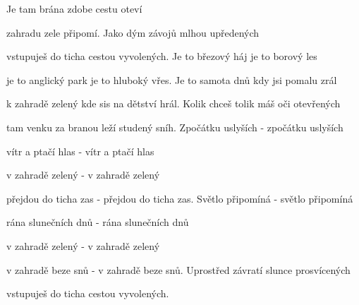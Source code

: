

\zs
Je tam brána zdobe cestu oteví

zahradu zele  připomí.
\ks
\zs
Jako dým závojů mlhou upředených

vstupuješ do ticha cestou vyvolených.
\ks
\zs
Je to březový háj je to borový les

je to anglický park je to hluboký vřes.
\ks
\zs
Je to samota dnů kdy jsi pomalu zrál

k zahradě zelený kde sis na dětství hrál.
\ks
\zs
Kolik chceš tolik máš oči otevřených

tam venku za branou leží studený sníh.
\ks
\zs
Zpočátku uslyších - zpočátku uslyších

vítr a ptačí hlas - vítr a ptačí hlas

v zahradě zelený - v zahradě zelený

přejdou do ticha zas - přejdou do ticha zas.
\ks
\zs
Světlo připomíná - světlo připomíná

rána slunečních dnů - rána slunečních dnů

v zahradě zelený - v zahradě zelený

v zahradě beze snů - v zahradě beze snů.
\ks
\zs
Uprostřed závratí slunce prosvícených

vstupuješ do ticha cestou vyvolených.
\ks
\kp






















